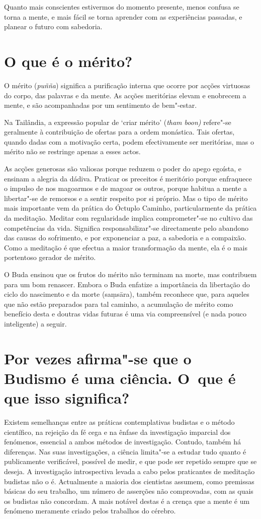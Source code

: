 Quanto mais conscientes estivermos do momento presente, menos confusa se
torna a mente, e mais fácil se torna aprender com as experiências
passadas, e planear o futuro com sabedoria.

\section{O que é o mérito?}

O mérito (\emph{puñña}) significa a purificação interna que ocorre por
acções virtuosas do corpo, das palavras e da mente. As acções meritórias
elevam e enobrecem a mente, e são acompanhadas por um sentimento de
bem"-estar.

Na Tailândia, a expressão popular de `criar mérito' (\emph{tham boon)}
refere"-se geralmente à contribuição de ofertas para a ordem monástica.
Tais ofertas, quando dadas com a motivação certa, podem efectivamente
ser meritórias, mas o mérito não se restringe apenas a esses actos.

As acções generosas são valiosas porque reduzem o poder do apego
egoísta, e ensinam a alegria da dádiva. Praticar os preceitos é
meritório porque enfraquece o impulso de nos magoarmos e de magoar os
outros, porque habitua a mente a libertar"-se de remorsos e a sentir
respeito por si próprio. Mas o tipo de mérito mais importante vem da
prática do Óctuplo Caminho, particularmente da prática da meditação.
Meditar com regularidade implica comprometer"-se no cultivo das
competências da vida. Significa responsabilizar"-se directamente pelo
abandono das causas do sofrimento, e por exponenciar a paz, a sabedoria
e a compaixão. Como a meditação é que efectua a maior transformação da
mente, ela é o mais portentoso gerador de mérito.

O Buda ensinou que os frutos do mérito não terminam na morte, mas
contribuem para um bom renascer. Embora o Buda enfatize a importância da
libertação do ciclo do nascimento e da morte (saṃsāra), também reconhece
que, para aqueles que não estão preparados para tal caminho, a
acumulação de mérito como benefício desta e doutras vidas futuras é uma
via compreensível (e nada pouco inteligente) a seguir.

\section{Por vezes afirma"-se que o Budismo é uma ciência. O~que é que isso
  significa?}

Existem semelhanças entre as práticas contemplativas budistas e o método
científico, na rejeição da fé cega e na ênfase da investigação imparcial
dos fenómenos, essencial a ambos métodos de investigação. Contudo,
também há diferenças. Nas suas investigações, a ciência limita"-se a
estudar tudo quanto é publicamente verificável, possível de medir, e que
pode ser repetido sempre que se deseja. A investigação introspectiva
levada a cabo pelos praticantes de meditação budistas não o é.
Actualmente a maioria dos cientistas assumem, como premissas básicas do
seu trabalho, um número de asserções não comprovadas, com as quais os
budistas não concordam. A mais notável destas é a crença que a mente é
um fenómeno meramente criado pelos trabalhos do cérebro.

